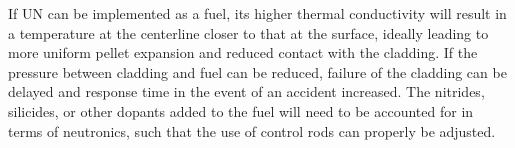 \documentclass[11pt]{article}
\begin{document}
\begin{multicols}{2}
\par 
If UN can be implemented as a fuel, its higher thermal conductivity will result in a temperature at the centerline closer to that at the surface, ideally leading to more uniform pellet expansion and reduced contact with the cladding. If the pressure between cladding and fuel can be reduced, failure of the cladding can be delayed and response time in the event of an accident increased. The nitrides, silicides, or other dopants added to the fuel will need to be accounted for in terms of neutronics, such that the use of control rods can properly be adjusted.

\par 





\end{multicols}
\end{document}

